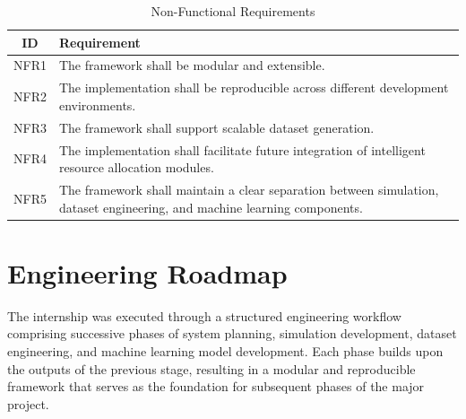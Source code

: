 \documentclass[12pt,a4paper]{report}
\begin{document}
	\begin{table}[H]
		\centering
		\caption{Non-Functional Requirements}
		\label{tab:nonfunctional_requirements}
		
		\begin{tabular}{|c|p{10.5cm}|}
			\hline
			
			\textbf{ID} &
			\textbf{Requirement}
			\\
			\hline
			
			NFR1 &
			The framework shall be modular and extensible.
			\\
			\hline
			
			NFR2 &
			The implementation shall be reproducible across different development environments.
			\\
			\hline
			
			NFR3 &
			The framework shall support scalable dataset generation.
			\\
			\hline
			
			NFR4 &
			The implementation shall facilitate future integration of intelligent resource allocation modules.
			\\
			\hline
			
			NFR5 &
			The framework shall maintain a clear separation between simulation, dataset engineering, and machine learning components.
			\\
			\hline
			
		\end{tabular}
		
	\end{table}
	
	\section{Engineering Roadmap}
	\label{sec:roadmap}
	
	The internship was executed through a structured engineering workflow comprising successive phases of system planning, simulation development, dataset engineering, and machine learning model development. Each phase builds upon the outputs of the previous stage, resulting in a modular and reproducible framework that serves as the foundation for subsequent phases of the major project.
	
\end{document}
